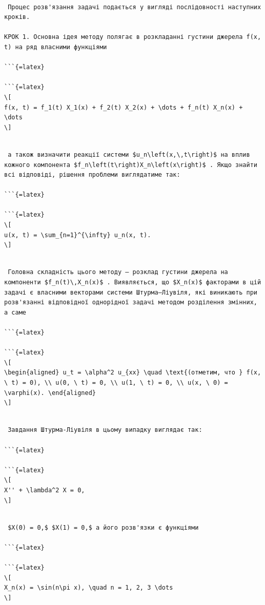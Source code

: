 \documentclass[
  ukrainian,
]{article}
\begin{document}
\begin{verbatim}

 Процес розв'язання задачі подається у вигляді послідовності наступних кроків.

КРОК 1. Основна ідея методу полягає в розкладанні густини джерела f(x, t) на ряд власними функціями

```{=latex}

```{=latex}
\[
f(x, t) = f_1(t) X_1(x) + f_2(t) X_2(x) + \dots + f_n(t) X_n(x) + \dots
\]
\end{verbatim}

\begin{verbatim}

 а також визначити реакції системи $u_n\left(x,\,t\right)$ на вплив кожного компонента $f_n\left(t\right)X_n\left(x\right)$ . Якщо знайти всі відповіді, рішення проблеми виглядатиме так:

```{=latex}

```{=latex}
\[
u(x, t) = \sum_{n=1}^{\infty} u_n(x, t).
\]
\end{verbatim}

\begin{verbatim}

 Головна складність цього методу — розклад густини джерела на компоненти $f_n(t)\,X_n(x)$ . Виявляється, що $X_n(x)$ факторами в цій задачі є власними векторами системи Штурма–Ліувіля, які виникають при розв'язанні відповідної однорідної задачі методом розділення змінних, а саме

```{=latex}

```{=latex}
\[
\begin{aligned} u_t = \alpha^2 u_{xx} \quad \text{(отметим, что } f(x, \ t) = 0), \\ u(0, \ t) = 0, \\ u(1, \ t) = 0, \\ u(x, \ 0) = \varphi(x). \end{aligned}
\]
\end{verbatim}

\begin{verbatim}

 Завдання Штурма-Ліувіля в цьому випадку виглядає так:

```{=latex}

```{=latex}
\[
X'' + \lambda^2 X = 0,
\]
\end{verbatim}

\begin{verbatim}

 $X(0) = 0,$ $X(1) = 0,$ а його розв'язки є функціями

```{=latex}

```{=latex}
\[
X_n(x) = \sin(n\pi x), \quad n = 1, 2, 3 \dots
\]
\end{verbatim}
\end{document}

